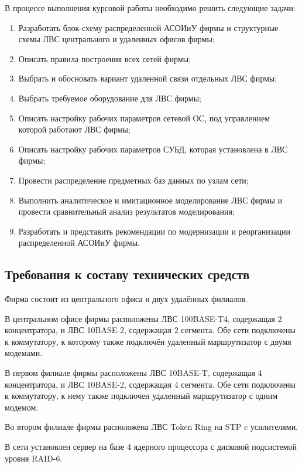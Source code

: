 В процессе выполнения курсовой работы необходимо решить следующие задачи:
\begin{enumerate}
\item Разработать блок-схему распределенной АСОИиУ фирмы и структурные схемы ЛВС центрального и удаленных офисов фирмы;
\item Описать правила построения всех сетей фирмы;
\item Выбрать и обосновать вариант удаленной связи отдельных ЛВС фирмы;
\item Выбрать требуемое оборудование для ЛВС фирмы;
\item Описать настройку рабочих параметров сетевой ОС, под управлением которой работают ЛВС фирмы;
\item Описать настройку рабочих параметров СУБД, которая установлена в ЛВС фирмы;
\item Провести распределение предметных баз данных по узлам сети;
\item Выполнить аналитическое и имитационное моделирование ЛВС фирмы и провести сравнительный анализ результатов моделирования;
\item Разработать и представить рекомендации по модернизации и реорганизации распределенной АСОИиУ фирмы.
\end{enumerate}

\subsection{Требования к составу технических средств}

Фирма состоит из центрального офиса и двух удалённых филиалов.\par\bigskip

В центральном офисе фирмы расположены ЛВС 100BASE-T4, содержащая 2 концентратора, и ЛВС 10BASE-2, содержащая 2 сегмента. Обе сети подключены к коммутатору, к которому также подключён удаленный маршрутизатор с двумя модемами.\par\bigskip

В первом филиале фирмы расположены ЛВС 10BASE-T, содержащая 4 концентратора, и ЛВС 10BASE-2, содержащая 4 сегмента. Обе сети подключены к коммутатору, к нему также подключен удаленный маршрутизатор с одним модемом.\par\bigskip

Во втором филиале фирмы расположена ЛВС Token Ring на STP c усилителями.\par\bigskip

В сети установлен сервер на базе 4 ядерного процессора с дисковой подсистемой уровня RAID-6.
 
